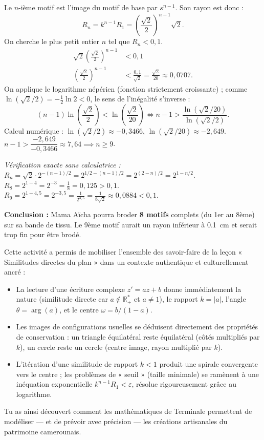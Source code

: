 \documentclass[11pt]{article}
\newcommand{\cle}[1]{{\popxbold\color{popdark}#1}}
\newcounter{popsec}
\newcounter{popsub}
\newcommand{\courssub}[1]{%
  \stepcounter{popsub}%
  \par\vspace{9pt}\noindent{\popxbold\fontsize{11.5}{13}\selectfont\color{popink}{\color{poporange}\thepopsec.\thepopsub}\hspace{6pt}#1}\par\nopagebreak\vspace{4pt}
}
\begin{document}
\begin{exoresolu}
Le $n$-ième motif est l'image du motif de base par $s^{n-1}$. Son rayon est donc :
\[
R_n = k^{n-1} R_1 = \left(\frac{\sqrt{2}}{2}\right)^{n-1} \sqrt{2}.
\]
On cherche le plus petit entier $n$ tel que $R_n < 0,1$.
\begin{align*}
\sqrt{2}\left(\frac{\sqrt{2}}{2}\right)^{n-1} &< 0,1 \\
\left(\frac{\sqrt{2}}{2}\right)^{n-1} &< \frac{0,1}{\sqrt{2}} = \frac{\sqrt{2}}{20} \approx 0,0707.
\end{align*}
On applique le logarithme népérien (fonction strictement croissante) ; comme $\ln(\sqrt{2}/2) = -\frac{1}{2}\ln 2 < 0$, le sens de l'inégalité s'inverse :
\[
(n-1)\ln\left(\frac{\sqrt{2}}{2}\right) < \ln\left(\frac{\sqrt{2}}{20}\right)
\iff n-1 > \frac{\ln(\sqrt{2}/20)}{\ln(\sqrt{2}/2)}.
\]
Calcul numérique :
$\ln(\sqrt{2}/2) \approx -0,3466$, $\ln(\sqrt{2}/20) \approx -2,649$.
$n-1 > \dfrac{-2,649}{-0,3466} \approx 7,64 \implies n \ge 9$.

\textit{Vérification exacte sans calculatrice :}
$R_n = \sqrt{2} \cdot 2^{-(n-1)/2} = 2^{1/2 - (n-1)/2} = 2^{(2-n)/2} = 2^{1 - n/2}$.
$R_8 = 2^{1-4} = 2^{-3} = \frac{1}{8} = 0,125 > 0,1$.
$R_9 = 2^{1-4,5} = 2^{-3,5} = \frac{1}{2^{3,5}} = \frac{1}{8\sqrt{2}} \approx 0,0884 < 0,1$.

\medskip
\noindent\textbf{Conclusion :} Mama Aïcha pourra broder \textbf{8 motifs} complets (du 1er au 8ème) sur sa bande de tissu. Le 9ème motif aurait un rayon inférieur à \SI{0,1}{cm} et serait trop fin pour être brodé.
\end{exoresolu}

\courssub{Bilan de l'activité}

Cette activité a permis de mobiliser l'ensemble des savoir-faire de la leçon « Similitudes directes du plan » dans un contexte authentique et culturellement ancré :
\begin{itemize}
\item La lecture d'une écriture complexe $z' = az + b$ donne immédiatement la \cle{nature} (similitude directe car $a\notin\mathbb{R}_+^*$ et $a\neq 1$), le \cle{rapport} $k=|a|$, l'\cle{angle} $\theta=\arg(a)$, et le \cle{centre} $\omega = b/(1-a)$.
\item Les images de configurations usuelles se déduisent directement des propriétés de conservation : un triangle équilatéral reste équilatéral (côtés multipliés par $k$), un cercle reste un cercle (centre image, rayon multiplié par $k$).
\item L'\cle{itération} d'une similitude de rapport $k<1$ produit une spirale convergente vers le centre ; les problèmes de « seuil » (taille minimale) se ramènent à une inéquation exponentielle $k^{n-1}R_1 < \varepsilon$, résolue rigoureusement grâce au logarithme.
\end{itemize}
Tu as ainsi découvert comment les mathématiques de Terminale permettent de modéliser — et de prévoir avec précision — les créations artisanales du patrimoine camerounais.
\end{document}
